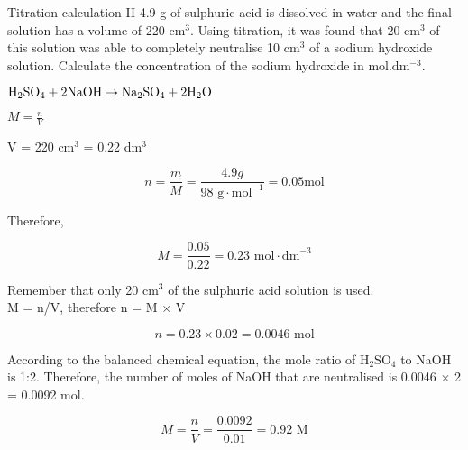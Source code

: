 \begin{wex}{Titration calculation II}{
4.9 g of sulphuric acid is dissolved in water and the final solution has a volume of 220 cm$^{3}$. Using titration, it was found that 20 cm$^{3}$ of this solution was able to completely neutralise 10 cm$^{3}$ of a sodium hydroxide solution. Calculate the concentration of the sodium hydroxide in mol.dm$^{-3}$.
}

{

$\rm{H_{2}SO_{4} + 2NaOH \rightarrow Na_{2}SO_{4} + 2H_{2}O}$
}

{

$M = \frac{n}{V}$

V = 220 cm$^{3}$ = 0.22 dm$^{3}$

\begin{equation*}
n = \frac{m}{M} = \frac{4.9 g}{98 \text{ g} \cdot \text{mol}^{-1}} = 0.05 \text{mol}
\end{equation*}

Therefore,

\begin{equation*}
M = \frac{0.05}{0.22} = 0.23 \text{ mol} \cdot \text{dm}^{-3}
\end{equation*}
}

{

Remember that only 20 cm$^{3}$ of the sulphuric acid solution is used.\\

M = n/V, therefore n = M $\times$ V

\begin{equation*}
n = 0.23 \times 0.02 = 0.0046 \text{ mol}
\end{equation*}
}

{

According to the balanced chemical equation, the mole ratio of H$_{2}$SO$_{4}$ to NaOH is 1:2. Therefore, the number of moles of NaOH that are neutralised is 0.0046 $\times$ 2 = 0.0092 mol.\\
}

{

\begin{equation*}
M = \frac{n}{V} = \frac{0.0092}{0.01} = 0.92 \text{ M}
\end{equation*}
}

\end{wex}

